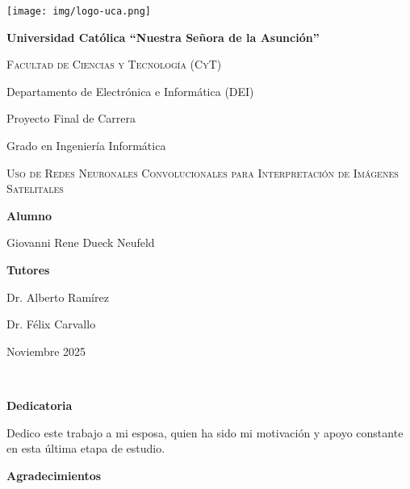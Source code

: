 \documentclass[a4paper, 11pt, twoside]{article}
\begin{document}
\begin{titlepage}
    \centering
    \texttt{[image: img/logo-uca.png]}\par
    {\bfseries\LARGE Universidad Católica \enquote{Nuestra Señora de la Asunción} \par}
    \vspace{1cm}
    {\scshape\Large Facultad de Ciencias y Tecnología (CyT)\par
    Departamento de Electrónica e Informática (DEI)\par}
    \vspace{1cm}
    {\Large Proyecto Final de Carrera \par
    Grado en Ingeniería Informática \par}
    \vspace{3cm}
    {\scshape\LARGE Uso de Redes Neuronales Convolucionales para Interpretación de Imágenes Satelitales \par}
    \vfill
    \begin{multicols}{2}
        \raggedright
        {\bf\Large Alumno\par}
        {\Large Giovanni Rene Dueck Neufeld\par}
        \newcolumn
        \raggedleft
        {\bf\Large Tutores\par}
        {\Large Dr. Alberto Ramírez\par Dr. Félix Carvallo\par}
    \end{multicols}
    \vfill
    {\Large Noviembre 2025 \par}
\end{titlepage}


\newpage
\ %
\newpage


\begin{center}
    {\bf Dedicatoria}
\end{center}

Dedico este trabajo a mi esposa, quien ha sido mi motivación y apoyo constante en esta última etapa de estudio.

\begin{center}
    {\bf Agradecimientos}
\end{center}


\newpage
\ %
\newpage

\pagestyle{headings}
\setcounter{page}{1}
\tableofcontents
\newpage

\listoffigures
\newpage

\listoftables
\newpage




\newpage
{}
\printbibliography
\end{document}

